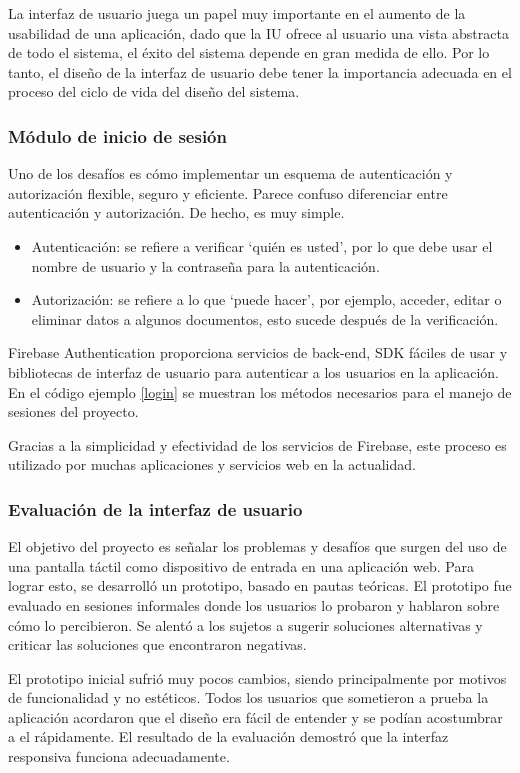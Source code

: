 La interfaz de usuario juega un papel muy importante en el aumento de la usabilidad de una aplicación, dado que la IU ofrece al usuario una vista abstracta de todo el sistema, el éxito del sistema depende en gran medida de ello. Por lo tanto, el diseño de la interfaz de usuario debe tener la importancia adecuada en el proceso del ciclo de vida del diseño del sistema.
\vspace{0.8cm}

\subsubsection{Módulo de inicio de sesión}
Uno de los desafíos es cómo implementar un esquema de autenticación y autorización flexible, seguro y eficiente. Parece confuso diferenciar entre autenticación y autorización. De hecho, es muy simple.

\begin{itemize}
  \item Autenticación: se refiere a verificar `quién es usted', por lo que debe usar el nombre de usuario y la contraseña para la autenticación.

  \item Autorización: se refiere a lo que `puede hacer', por ejemplo, acceder, editar o eliminar datos a algunos documentos, esto sucede después de la verificación.
\end{itemize}

Firebase Authentication proporciona servicios de back-end, SDK fáciles de usar y bibliotecas de interfaz de usuario para autenticar a los usuarios en la aplicación. En el código ejemplo \ref{login} se muestran los métodos necesarios para el manejo de sesiones del proyecto.
\vspace{0.8cm}



Gracias a la simplicidad y efectividad de los servicios de Firebase, este proceso es utilizado por muchas aplicaciones y servicios web en la actualidad.
\vspace{0.8cm}

\subsubsection{Evaluación de la interfaz de usuario}
El objetivo del proyecto es señalar los problemas y desafíos que surgen del uso de una pantalla táctil como dispositivo de entrada en una aplicación web. Para lograr esto, se desarrolló un prototipo, basado en pautas teóricas. El prototipo fue evaluado en sesiones informales donde los usuarios lo probaron y hablaron sobre cómo lo percibieron. Se alentó a los sujetos a sugerir soluciones alternativas y criticar las soluciones que encontraron negativas.
\vspace{0.8cm}

El prototipo inicial sufrió muy pocos cambios, siendo principalmente por motivos de funcionalidad y no estéticos. Todos los usuarios que sometieron a prueba la aplicación acordaron que el diseño era fácil de entender y se podían acostumbrar a el rápidamente. El resultado de la evaluación demostró que la interfaz responsiva funciona adecuadamente.